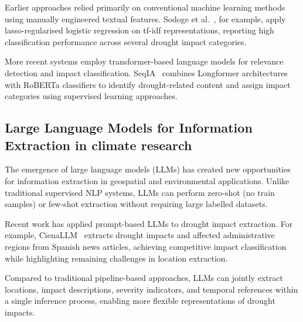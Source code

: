 Earlier approaches relied primarily on conventional machine learning methods using manually engineered textual features. Sodoge et al.~\cite{sodoge2023}, for example, apply lasso-regularised logistic regression on tf-idf representations, reporting high classification performance across several drought impact categories.

More recent systems employ transformer-based language models for relevance detection and impact classification. SeqIA~\cite{lopez2025} combines Longformer architectures with RoBERTa classifiers to identify drought-related content and assign impact categories using supervised learning approaches.


\subsection{Large Language Models for Information Extraction in climate research}

The emergence of large language models (LLMs) has created new opportunities for information extraction in geospatial and environmental applications. Unlike traditional supervised NLP systems, LLMs can perform zero-shot (no train samples) or few-shot extraction without requiring large labelled datasets.

Recent work has applied prompt-based LLMs to drought impact extraction. For example, CienaLLM~\cite{ciena2025} extracts drought impacts and affected administrative regions from Spanish news articles, achieving competitive impact classification while highlighting remaining challenges in location extraction.

Compared to traditional pipeline-based approaches, LLMs can jointly extract locations, impact descriptions, severity indicators, and temporal references within a single inference process, enabling more flexible representations of drought impacts.






